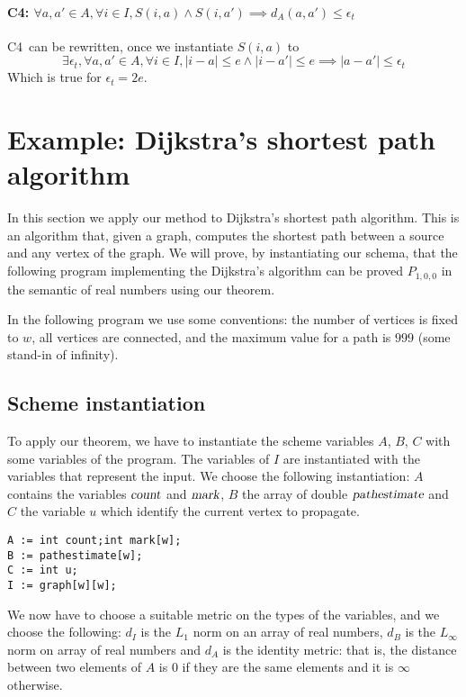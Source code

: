 \documentclass[copyright,creativecommons]{eptcs}
\newcommand{\pe}{\hbox{\sl pathestimate}}
\newcommand{\cnt}{\hbox{\sl count}}
\newcommand{\mrk}{\hbox{\sl mark}}
\newcommand{\Cfour}{C4}
\newcommand{\AND}{\mathrel{\wedge}}
\begin{document}
\paragraph{\Cfour: $\forall a,a' \in A,\forall i \in I, S(i,a) \AND S(i,a') \implies d_A(a,a') \leq \epsilon_t$}
\Cfour \, can be rewritten, once we instantiate $S(i,a)$ to 
\[\exists \epsilon_t, \forall a,a' \in A,\forall i \in I, |i-a|\leq e \AND |i-a'| \leq e \implies |a-a'| \leq \epsilon_t \]
Which is true for $\epsilon_t = 2e$.



\section{Example: Dijkstra's shortest path algorithm}\label{sec:dijkstra}

In this section we apply our method   to Dijkstra's shortest path algorithm. This is an algorithm that, given a graph, 
computes the shortest path between a source and any vertex of the
graph. We will prove, by instantiating our schema,  that the following program  implementing the Dijkstra's algorithm can be proved $P_{1,0,0}$
in the semantic of real numbers using our theorem. 

In the following program we use some conventions: the number of
vertices is  fixed to $w$, all 
vertices are connected,  and the maximum  value for a path is $999$ (some
stand-in of infinity).



{}


\subsection{Scheme instantiation}
To apply our theorem, we have to instantiate the scheme variables  $A$, $B$, $C$ with some variables of the program.  The variables of $I$ are instantiated with the variables that represent the input. 
We choose the following instantiation: $A$ contains the variables $\cnt$ and $\mrk$, $B$ the
array of double $\pe$ and $C$ the variable $u$ which identify the
current vertex to propagate. 

{\scriptsize\begin{lstlisting}
A := int count;int mark[w];
B := pathestimate[w];
C := int u;
I := graph[w][w];
\end{lstlisting}}

We now have to choose a suitable metric on the types of the variables, and we choose the following: $d_I$ is the $L_1$ norm on an
array of real numbers, $d_B$ is the $L_\infty$ norm on array of real numbers  and $d_A$ is the identity metric: that is, the
distance between two elements of $A$ is  $0$ if they are the same
elements and it is $\infty$ otherwise.  
\end{document}
